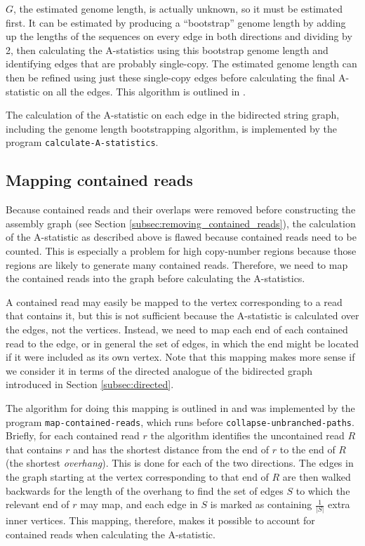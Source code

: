 \documentclass[12pt]{article}
\newcommand{\Subsection}[1]{Section \ref{#1}}
\newcommand{\KeyTerm}[1]{{\it #1}}
\newcommand{\ProgramName}[1]{{\tt #1}}
\begin{document}
$G$, the estimated genome length, is actually unknown, so it must be estimated
first.  It can be estimated by producing a ``bootstrap'' genome length by adding
up the lengths of the sequences on every edge in both directions and dividing by
2, then calculating the A-statistics using this bootstrap genome length and
identifying edges that are probably single-copy.  The estimated genome length
can then be refined using just these single-copy edges before calculating the
final A-statistic on all the edges.  This algorithm is outlined in
\cite{Myers2005}.

The calculation of the A-statistic on each edge in the bidirected string graph,
including the genome length bootstrapping algorithm, is implemented by the
program {\tt calculate-A-statistics}.

\subsection{Mapping contained reads}

Because contained reads and their overlaps were removed before constructing the
assembly graph (see \Subsection{subsec:removing_contained_reads}), the
calculation of the A-statistic as described above is flawed because contained
reads need to be counted.  This is especially a problem for high copy-number
regions because those regions are likely to generate many contained reads.
Therefore, we need to map the contained reads into the graph before calculating
the A-statistics.

A contained read may easily be mapped to the vertex corresponding to a read that
contains it, but this is not sufficient because the A-statistic is calculated
over the edges, not the vertices.  Instead, we need to map each end of each
contained read to the edge, or in general the set of edges, in which the end
might be located if it were included as its own vertex.  Note that this mapping
makes more sense if we consider it in terms of the directed analogue of the
bidirected graph introduced in \Subsection{subsec:directed}.

The algorithm for doing this mapping is outlined in \cite{Myers2005} and was
implemented by the program \ProgramName{map-contained-reads}, which runs before
\ProgramName{collapse-unbranched-paths}.  Briefly, for each contained read $r$
the algorithm identifies the uncontained read $R$ that contains $r$ and has the
shortest distance from the end of $r$ to the end of $R$ (the shortest
\KeyTerm{overhang}).  This is done for each of the two directions.  The edges in
the graph starting at the vertex corresponding to that end of $R$ are then
walked backwards for the length of the overhang to find the set of edges $S$ to
which the relevant end of $r$ may map, and each edge in $S$ is marked as
containing $\frac{1}{|S|}$ extra inner vertices.  This mapping, therefore, makes
it possible to account for contained reads when calculating the A-statistic.
\end{document}
